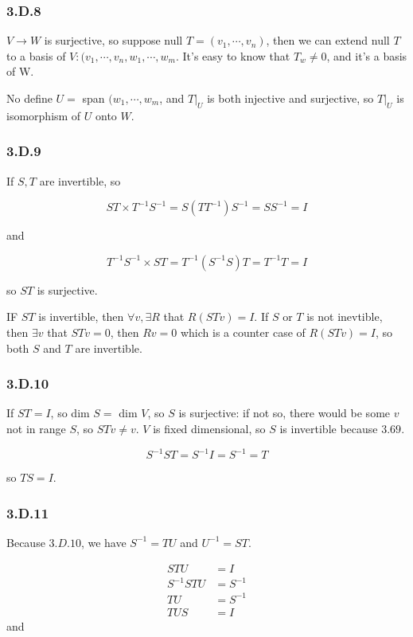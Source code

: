 \subsubsection*{3.D.8}

$V \to W$ is surjective, so suppose null $T = (v_{1}, \cdots, v_{n})$, then we can extend null $T$ to a basis of $V: (v_{1}, \cdots, v_{n}, w_{1},\cdots, w_{m}$.
It's easy to know that $T_{w} \neq 0$, and it's a basis of W.

No define $U = $ span $(w_{1}, \cdots, w_{m}$, and $T|_{U}$ is both injective and surjective, so $T|_{U}$ is isomorphism of $U$ onto $W$.

\subsubsection*{3.D.9}

If $S,T$ are invertible, so 

\[ST\times T^{-1}S^{-1} = S(TT^{-1})S^{-1} = SS^{-1} = I \]

and

\[T^{-1}S^{-1}\times ST = T^{-1}(S^{-1}S)T = T^{-1}T = I \]

so $ST$ is surjective.

IF $ST$ is invertible, then $\forall v, \exists R$ that $R(STv) = I$. If $S$ or $T$ is not inevtible, then $\exists v $ that $STv = 0$, then $Rv = 0$ which is a counter case 
of $R(STv) = I$, so both $S$ and $T$ are invertible.

\subsubsection*{3.D.10}

If $ST = I$, so dim $S = $ dim $V$, so $S$ is surjective: if not so, there would be some $v$ not in range $S$, so $STv \neq v$. $V$ is fixed dimensional, so $S$ is invertible because $3.69$.

\[S^{-1}ST = S^{-1}I = S^{-1} = T\]

so $TS = I$.

\subsubsection*{3.D.11}

Because $3.D.10$, we have $S^{-1} = TU$ and $U^{-1} = ST$.

\begin{equation*}
    \begin{split}
    STU &= I \\
    S^{-1}STU &= S^{-1} \\
    TU &= S^{-1} \\
    TUS &= I
\end{split}
\end{equation*}
and 

